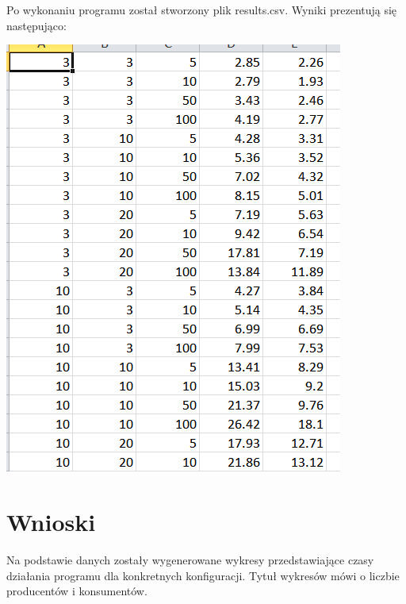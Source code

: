 \documentclass[12pt]{article}
\begin{document}
\noindent
Po wykonaniu programu został stworzony plik results.csv. Wyniki prezentują się następująco:
\begin{center}
\centering
    \includegraphics[scale=0.8]{csv.png}
\end{center}
\newpage


\section{Wnioski}
Na podstawie danych zostały wygenerowane wykresy przedstawiające czasy działania programu dla konkretnych konfiguracji. Tytuł wykresów mówi o liczbie producentów i konsumentów.
\end{document}
